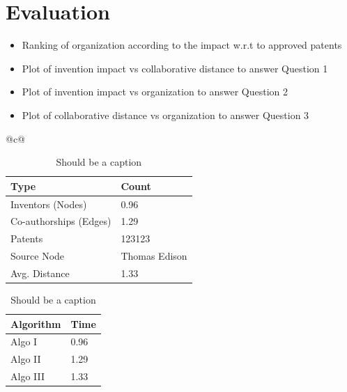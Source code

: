 \section{Evaluation}
	\begin{itemize}
	\squish
		\item Ranking of organization according to the impact w.r.t to approved patents
		\item Plot of invention impact vs collaborative distance to answer Question 1
		\item Plot of invention impact vs organization to answer Question 2
		\item Plot of collaborative distance vs organization to answer Question 3
	\end{itemize}

\begin{table}[t] 
  \begin{tabular}{@{}c@{}} 
  \begin{minipage}{0.4\linewidth}
		\begin{center}
	  		\begin{tabular}{| l | l |}
				\hline
				{Type} & {Count} \\
				\hline
				\hline
				Inventors (Nodes) & 0.96 \\
				Co-authorships (Edges) & 1.29 \\
				Patents & 123123 \\
				Source Node & Thomas Edison\\
				Avg. Distance & 1.33 \\
				\hline
			\end{tabular}		
			\caption {Should be a caption}

			\vspace{0.85cm}

			\begin{tabular}{| l | l |}
				\hline
				{Algorithm} & {Time} \\
				\hline
				\hline
				Algo I & 0.96 \\
				Algo II & 1.29 \\
				Algo III & 1.33 \\
				\hline
			\end{tabular}
			\caption {Should be a caption}
		\end{center}


\end{minipage}
\end{tabular}
\end{table}
